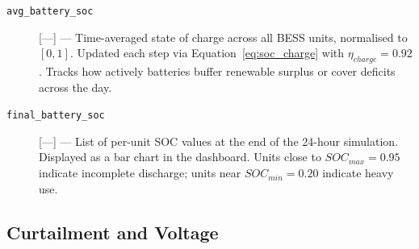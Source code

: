 \begin{description}

\item[\texttt{avg\_battery\_soc}] [---] ---
  Time-averaged state of charge across all BESS units, normalised to $[0,1]$.
  Updated each step via Equation~\ref{eq:soc_charge} with
  $\eta_{charge} = 0.92$.  Tracks how actively batteries buffer renewable
  surplus or cover deficits across the day.

\item[\texttt{final\_battery\_soc}] [---] ---
  List of per-unit SOC values at the end of the 24-hour simulation.  Displayed
  as a bar chart in the dashboard.  Units close to $SOC_{max} = 0.95$ indicate
  incomplete discharge; units near $SOC_{min} = 0.20$ indicate heavy use.

\end{description}

\subsection*{Curtailment and Voltage}

